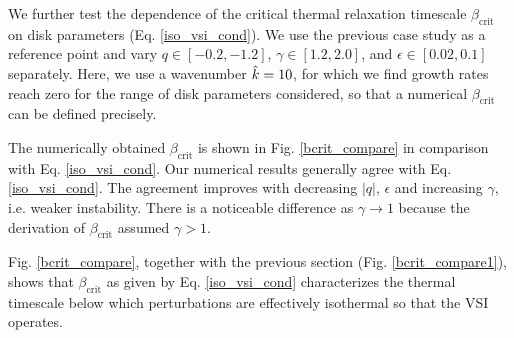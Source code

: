 We further test the dependence of the critical thermal relaxation timescale 
$\beta_\mathrm{crit}$ on disk parameters
(Eq. \ref{iso_vsi_cond}).  We use the previous case study as a
reference point and vary $q\in[-0.2,-1.2]$, 
$\gamma\in[1.2,2.0]$, and $\epsilon\in[0.02,0.1]$
separately. Here, we use a wavenumber $\hat{k}=10$, for which we
find growth rates reach zero for the range of disk parameters
considered, so that a numerical $\beta_\mathrm{crit}$ can be defined precisely. 

The numerically obtained $\beta_\mathrm{crit}$ is shown in
Fig. \ref{bcrit_compare} in comparison with Eq. \ref{iso_vsi_cond}.
Our numerical results generally agree with Eq. \ref{iso_vsi_cond}. The
agreement improves with decreasing  $|q|$,  $\epsilon$ and increasing
$\gamma$, i.e. weaker instability. There is a noticeable difference
as $\gamma\to1$ because the derivation of $\beta_\mathrm{crit}$
assumed $\gamma>1$.   

Fig. \ref{bcrit_compare}, together with the previous section
(Fig. \ref{bcrit_compare1}), shows that $\beta_\mathrm{crit}$ as given
by Eq. \ref{iso_vsi_cond} characterizes the thermal timescale below
which perturbations are effectively isothermal 
so that the VSI operates. 



